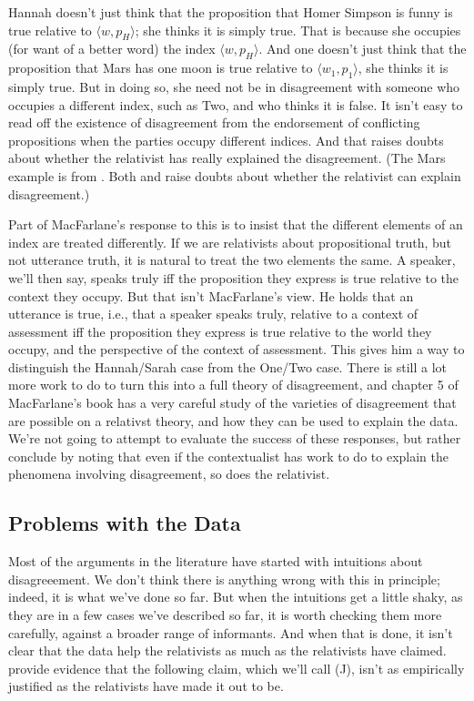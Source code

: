 Hannah doesn't just think that the proposition that Homer Simpson is funny is true relative to $\langle w, p_H\rangle$; she thinks it is simply true. That is because she occupies (for want of a better word) the index $\langle w, p_H\rangle$. And one doesn't just think that the proposition that Mars has one moon is true relative to $\langle w_1, p_1\rangle$, she thinks it is simply true. But in doing so, she need not be in disagreement with someone who occupies a different index, such as Two, and who thinks it is false. It isn't easy to read off the existence of disagreement from the endorsement of conflicting propositions when the parties occupy different indices. And that raises doubts about whether the relativist has really explained the disagreement. (The Mars example is from  \citet[128]{MacFarlane2014}. Both  \citet{Dreier2009} and  \citet{Francen2010} raise doubts about whether the relativist can explain disagreement.)

Part of MacFarlane's response to this is to insist that the different elements of an index are treated differently. If we are relativists about propositional truth, but not utterance truth, it is natural to treat the two elements the same. A speaker, we'll then say, speaks truly iff the proposition they express is true relative to the context they occupy. But that isn't MacFarlane's view. He holds that an utterance is true, i.e., that a speaker speaks truly, relative to a context of assessment iff the proposition they express is true relative to the world they occupy, and the perspective of the context of assessment. This gives him a way to distinguish the Hannah\slash Sarah case from the One\slash Two case. There is still a lot more work to do to turn this into a full theory of disagreement, and chapter 5 of MacFarlane's book has a very careful study of the varieties of disagreement that are possible on a relativst theory, and how they can be used to explain the data. We're not going to attempt to evaluate the success of these responses, but rather conclude by noting that even if the contextualist has work to do to explain the phenomena involving disagreement, so does the relativist.

\subsection{Problems with the Data}
\label{problemswiththedata}

Most of the arguments in the literature have started with intuitions about disagreeement. We don't think there is anything wrong with this in principle; indeed, it is what we've done so far. But when the intuitions get a little shaky, as they are in a few cases we've described so far, it is worth checking them more carefully, against a broader range of informants. And when that is done, it isn't clear that the data help the relativists as much as the relativists have claimed.  \citet{KnobeYalcin2014} provide evidence that the following claim, which we'll call (J), isn't as empirically justified as the relativists have made it out to be.

